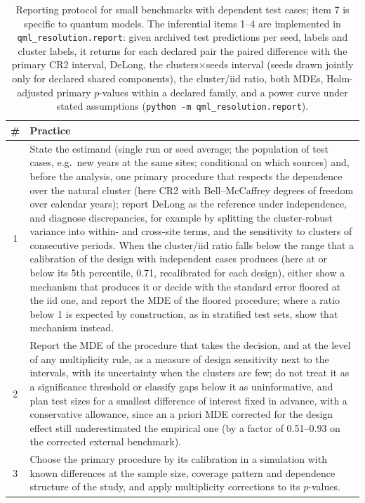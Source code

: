 \documentclass[11pt,a4paper]{article}
\begin{document}
\begin{table}[htbp]
\centering
\caption{Reporting protocol for small benchmarks with dependent test cases; item 7 is specific to quantum models. The inferential items 1--4 are implemented in \texttt{qml\_resolution.report}: given archived test predictions per seed, labels and cluster labels, it returns for each declared pair the paired difference with the primary CR2 interval, DeLong, the clusters$\times$seeds interval (seeds drawn jointly only for declared shared components), the cluster/iid ratio, both MDEs, Holm-adjusted primary $p$-values within a declared family, and a power curve under stated assumptions (\texttt{python -m qml\_resolution.report}).}
\label{tab:protocol}
{\small
\begin{tabularx}{\textwidth}{cX}
\toprule
\textbf{\#} & \textbf{Practice} \\
\midrule
1 & State the estimand (single run or seed average; the population of test cases, e.g.\ new years at the same sites; conditional on which sources) and, before the analysis, one primary procedure that respects the dependence over the natural cluster (here CR2 with Bell--McCaffrey degrees of freedom over calendar years); report DeLong as the reference under independence, and diagnose discrepancies, for example by splitting the cluster-robust variance into within- and cross-site terms, and the sensitivity to clusters of consecutive periods. When the cluster/iid ratio falls below the range that a calibration of the design with independent cases produces (here at or below its 5th percentile, 0.71, recalibrated for each design), either show a mechanism that produces it or decide with the standard error floored at the iid one, and report the MDE of the floored procedure; where a ratio below 1 is expected by construction, as in stratified test sets, show that mechanism instead. \\
2 & Report the MDE of the procedure that takes the decision, and at the level of any multiplicity rule, as a measure of design sensitivity next to the intervals, with its uncertainty when the clusters are few; do not treat it as a significance threshold or classify gaps below it as uninformative, and plan test sizes for a smallest difference of interest fixed in advance, with a conservative allowance, since an a priori MDE corrected for the design effect still underestimated the empirical one (by a factor of 0.51--0.93 on the corrected external benchmark). \\
3 & Choose the primary procedure by its calibration in a simulation with known differences at the sample size, coverage pattern and dependence structure of the study, and apply multiplicity corrections to its $p$-values. \\

\end{tabularx}}
\end{table}
\end{document}
